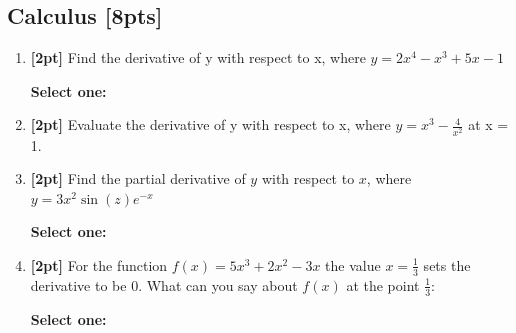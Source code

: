 \documentclass[12pt]{article}
\renewcommand{\circle}{\tikz\draw[black] (0,0) circle (1ex);}
\begin{document}
\subsection{Calculus [8pts]}
\begin{enumerate}
    \item \textbf{[2pt]} Find the derivative of y with respect to x, where $y=2x^4-x^3+5x-1$

    \textbf{Select one:}



    \item \textbf{[2pt]} Evaluate the derivative of y with respect to x, where $y = x^3 - \frac{4}{x^2}$ at x = 1.

    \begin{tcolorbox}[fit,height=1cm, width=2cm, blank, borderline={1pt}{-2pt},nobeforeafter]
    \end{tcolorbox}



    \item \textbf{[2pt]} Find the partial derivative of $y$ with respect to $x$, where $y= 3x^2 \sin(z) e^{-x}$

    \textbf{Select one:}



    \item \textbf{[2pt]} For the function $f(x)= 5x^3 +2x^2-3x$ the value $x=\frac{1}{3}$ sets the derivative to be 0. What can you say about $f(x)$ at the point $\frac{1}{3}$:

    \textbf{Select one:}



    \clearpage
\end{enumerate}
\end{document}
